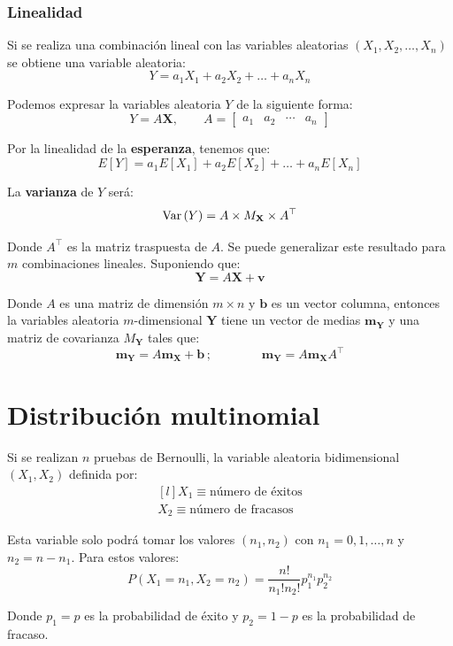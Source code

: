 \documentclass[a4paper]{book}
\renewcommand{\vec}[1]{\mathbf{#1}} %
\begin{document}
\subsubsection{Linealidad}
Si se realiza una combinación lineal con las variables aleatorias $\left( X_1,X_2, \dots , X_n \right)$ se obtiene una variable aleatoria:
\[ Y = a_1X_1 + a_2X_2 + \dots + a_nX_n \]

Podemos expresar la variables aleatoria $Y$ de la siguiente forma:
\[ Y = A \vec{X}, \qquad A = \left[ 
\begin{matrix}
	a_1 & a_2 & \cdots & a_n
\end{matrix} \right] \]

Por la linealidad de la \textbf{esperanza}, tenemos que:
\[ E \left[ Y \right] = a_1E \left[ X_1 \right] + a_2 E \left[ X_2 \right] + \dots + a_n E \left[ X_n \right] \]

La \textbf{varianza} de $Y$ será:
\[ \Var \left( Y \right) = A \times M_{\vec{X}} \times A ^{\top} \]

Donde $A ^{\top} $ es la matriz traspuesta de $A$. Se puede generalizar este resultado para $m$ combinaciones lineales. Suponiendo que:
\[ \vec{Y} = A \vec{X} + \vec{v} \]
 
Donde $A$ es una matriz de dimensión $m \times n$ y $\vec{b}$ es un vector columna, entonces la variables aleatoria $m$-dimensional $\vec{Y}$ tiene un vector de medias $\vec{m}_{\vec{Y}}$ y una matriz de covarianza $M_{\vec{Y}}$ tales que:
\[ \vec{m}_{\vec{Y}} = A \vec{m}_{\vec{X}} + \vec{b} \, ; \qquad \qquad \vec{m}_{\vec{Y}} = A \vec{m}_{\vec{X}} A ^{\top} \]

\section{Distribución multinomial}

Si se realizan $n$ pruebas de Bernoulli, la variable aleatoria bidimensional $\left( X_1, X_2 \right)$ definida por:
\[ \begin{matrix*}[l]
	X_1 \equiv \text{número de éxitos}\\[5pt] 
	X_2 \equiv \text{número de fracasos}
\end{matrix*} \]

Esta variable solo podrá tomar los valores $\left( n_1, n_2 \right)$ con $n_1 = 0,1, \dots , n$ y $n_2 = n - n_1$. Para estos valores:
\[ P \left( X_1 = n_1, X_2 = n_2 \right) = \frac{n!}{n_1!n_2!} p_1^{n_1} p_2^{n_2}\]

Donde $p_1 = p$ es la probabilidad de éxito y $p_2 = 1-p$ es la probabilidad de fracaso.
\end{document}
